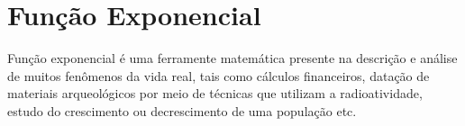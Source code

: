 \chapter{Função Exponencial}




Função exponencial é uma ferramente matemática presente na descrição e análise de muitos fenômenos da vida real, tais como cálculos financeiros, datação de materiais arqueológicos por meio de técnicas que utilizam a radioatividade, estudo do crescimento ou decrescimento de uma população etc.

